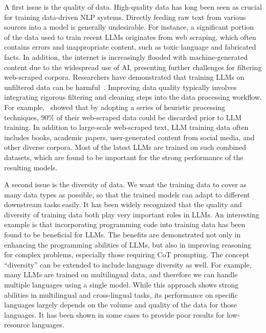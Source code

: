 A first issue is the quality of data. High-quality data has long been seen as crucial for training data-driven NLP systems. Directly feeding raw text from various sources into a model is generally undesirable. For instance, a significant portion of the data used to train recent LLMs originates from web scraping, which often contains errors and inappropriate content, such as toxic language and fabricated facts.  In addition, the internet is increasingly flooded with machine-generated content due to the widespread use of AI, presenting further challenges for filtering web-scraped corpora. Researchers have demonstrated that training LLMs on unfiltered data can be harmful~\cite{raffel-etal:2020exploring}. Improving data quality typically involves integrating rigorous filtering and cleaning steps into the data processing workflow. For example,~\citet{penedo-etal:2023refinedweb} showed that by adopting a series of heuristic processing techniques, 90\% of their web-scraped data could be discarded prior to LLM training. In addition to large-scale web-scraped text, LLM training data often includes books, academic papers, user-generated content from social media, and other diverse corpora. Most of the latest LLMs are trained on such combined datasets, which are found to be important for the strong performance of the resulting models.

A second issue is the diversity of data. We want the training data to cover as many data types as possible, so that the trained models can adapt to different downstream tasks easily. It has been widely recognized that the quality and diversity of training data both play very important roles in LLMs. An interesting example is that incorporating programming code into training data has been found to be beneficial for LLMs. The benefits are demonstrated not only in enhancing the programming abilities of LLMs, but also in improving reasoning for complex problems, especially those requiring CoT prompting. The concept ``diversity'' can be extended to include language diversity as well. For example, many LLMs are trained on multilingual data, and therefore we can handle multiple languages using a single model. While this approach shows strong abilities in multilingual and cross-lingual tasks, its performance on specific languages largely depends on the volume and quality of the data for those languages. It has been shown in some cases to provide poor results for low-resource languages.

